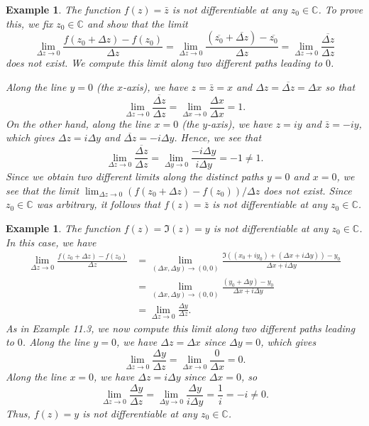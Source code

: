 \documentclass[10pt]{article}
\newcommand{\C}{\mathbb{C}}
\theoremstyle{newstyle}
\newtheorem{exmp}[thm]{Example}
\begin{document}
\begin{exmp}
The function $f(z) = \bar{z}$ is not differentiable at any $z_0 \in \C$. To prove this, 
we fix $z_0 \in \C$ and show that the limit 
\[ \lim_{\Delta z \to 0} \frac{f(z_0 + \Delta z) - f(z_0)}{\Delta z} = \lim_{\Delta z \to 0} 
\frac{(\overline{z_0} + \overline{\Delta z}) - \overline{z_0}}{\Delta z} = 
\lim_{\Delta z \to 0} \frac{\overline{\Delta z}}{\Delta z} \]
does not exist. We compute this limit along two different paths leading to $0$. 

Along the line $y = 0$ (the $x$-axis), we have $z = \bar{z} = x$ and $\Delta z = 
\overline{\Delta z} = \Delta x$ so that 
\[ \lim_{\Delta z \to 0} \frac{\overline{\Delta z}}{\Delta z} = \lim_{\Delta x \to 0} 
\frac{\Delta x}{\Delta x} = 1. \]
On the other hand, along the line $x = 0$ (the $y$-axis), we have $z = iy$ and $\bar{z} = -iy$, 
which gives $\Delta z = i\Delta y$ and $\overline{\Delta z} = -i\Delta y$. Hence, we see that 
\[ \lim_{\Delta z \to 0} \frac{\overline{\Delta z}}{\Delta z} = \lim_{\Delta y \to 0} 
\frac{-i\Delta y}{i\Delta y} = -1 \neq 1. \]
Since we obtain two different limits along the distinct paths $y = 0$ and $x = 0$, we see that 
the limit
$\lim_{\Delta z \to 0} (f(z_0 + \Delta z) - f(z_0))/\Delta z$ does not exist. Since 
$z_0 \in \C$ was arbitrary, it follows that $f(z) = \bar{z}$ is not differentiable at any $z_0 \in \C$. 
\end{exmp}

\begin{exmp}
The function $f(z) = \Im(z) = y$ is not differentiable at any $z_0 \in \C$. In this case, we have 
\begin{align*}
    \lim_{\Delta z \to 0} \frac{f(z_0 + \Delta z) - f(z_0)}{\Delta z} 
    &= \lim_{(\Delta x, \Delta y) \to (0, 0)} \frac{\Im((x_0 + iy_0) + (\Delta x + i\Delta y)) - y_0}
    {\Delta x + i\Delta y} \\
    &= \lim_{(\Delta x, \Delta y) \to (0, 0)} \frac{(y_0 + \Delta y) - y_0}{\Delta x + i\Delta y} \\
    &= \lim_{\Delta z \to 0} \frac{\Delta y}{\Delta z}.
\end{align*}
As in Example 11.3, we now compute this limit along two different paths leading to $0$. 
Along the line $y = 0$, we have $\Delta z = \Delta x$ since $\Delta y = 0$, which gives 
\[ \lim_{\Delta z \to 0} \frac{\Delta y}{\Delta z} = \lim_{\Delta x \to 0} \frac{0}{\Delta x} = 0. \]
Along the line $x = 0$, we have $\Delta z = i\Delta y$ since $\Delta x = 0$, so 
\[ \lim_{\Delta z \to 0} \frac{\Delta y}{\Delta z} = \lim_{\Delta y \to 0} \frac{\Delta y}{i\Delta y}
= \frac{1}{i} = -i \neq 0. \]
Thus, $f(z) = y$ is not differentiable at any $z_0 \in \C$. 
\end{exmp}
\end{document}
